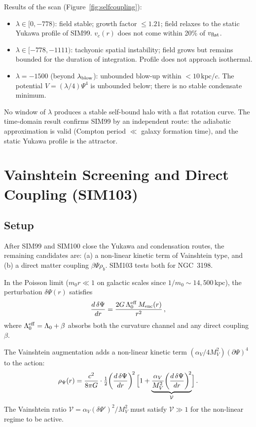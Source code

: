 \documentclass[12pt,a4paper]{article}
\newcommand{\Lz}{\Lambda_0}
\newcommand{\vflat}{v_{\rm flat}}
\theoremstyle{plain}
\begin{document}
Results of the scan (Figure~\ref{fig:selfcoupling}):
\begin{itemize}
  \item $\lambda \in [0, -778)$: field stable; growth factor $\leq 1.21$;
        field relaxes to the static Yukawa profile of SIM99.
        $v_c(r)$ does not come within 20\% of $\vflat$.
  \item $\lambda \in [-778, -1111)$: tachyonic spatial instability;
        field grows but remains bounded for the duration of integration.
        Profile does not approach isothermal.
  \item $\lambda = -1500$ (beyond $\lambda_{\rm blow}$): unbounded blow-up
        within $< 10\,\mathrm{kpc}/c$. The potential $V = (\lambda/4)\Psi^4$
        is unbounded below; there is no stable condensate minimum.
\end{itemize}

No window of $\lambda$ produces a stable self-bound halo with a flat rotation
curve. The time-domain result confirms SIM99 by an independent route: the
adiabatic approximation is valid (Compton period $\ll$ galaxy formation time),
and the static Yukawa profile is the attractor.

\section{Vainshtein Screening and Direct Coupling (SIM103)}
\label{sec:sim103}

\subsection{Setup}

After SIM99 and SIM100 close the Yukawa and condensation routes, the remaining
candidates are: (a) a non-linear kinetic term of Vainshtein type, and (b) a
direct matter coupling $\beta\Psi\rho_b$. SIM103 tests both for NGC~3198.

In the Poisson limit ($m_0 r \ll 1$ on galactic scales since $1/m_0 \sim
14{,}500\,\mathrm{kpc}$), the perturbation $\delta\Psi(r)$ satisfies
\begin{equation}
  \frac{d\,\delta\Psi}{dr}
  = \frac{2G\,\Lz^{\rm eff}\,M_{\rm enc}(r)}{r^2}\,,
  \label{eq:poisson-grad}
\end{equation}
where $\Lz^{\rm eff} = \Lz + \beta$ absorbs both the curvature channel and
any direct coupling $\beta$.

The Vainshtein augmentation adds a non-linear kinetic term
$(\alpha_V/4M_V^2)(\partial\Psi)^4$ to the action:
\begin{equation}
  \rho_\Psi(r) = \frac{c^2}{8\pi G}
  \cdot\tfrac{1}{2}\!\left(\frac{d\,\delta\Psi}{dr}\right)^{\!2}
  \Bigl[1 + \underbrace{\frac{\alpha_V}{M_V^2}\!\left(\frac{d\,\delta\Psi}{dr}\right)^{\!2}}_{\mathcal{V}}\Bigr]\,.
  \label{eq:vainshtein-rho}
\end{equation}
The Vainshtein ratio $\mathcal{V} = \alpha_V(\delta\Psi')^2/M_V^2$ must satisfy
$\mathcal{V} \gg 1$ for the non-linear regime to be active.
\end{document}
